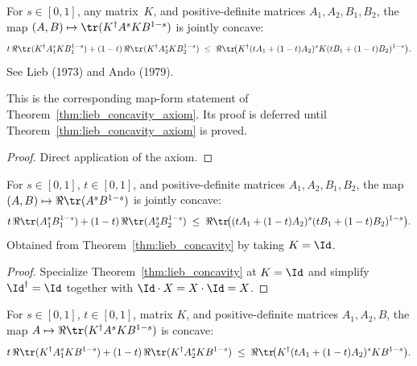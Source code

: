 \begin{theorem}\label{thm:lieb_concavity_axiom}
    \notready
    For $s\in[0,1]$, any matrix~$K$, and positive-definite matrices
    $A_1,A_2,B_1,B_2$, the map
    $(A,B)\mapsto\tr(K^\dagger A^s K B^{1-s})$
    is jointly concave:
    \[
        t\,\Re\tr(K^\dagger A_1^s K B_1^{1-s})
        +(1-t)\,\Re\tr(K^\dagger A_2^s K B_2^{1-s})
        \;\le\;
        \Re\tr\!\bigl(K^\dagger(tA_1+(1-t)A_2)^s K (tB_1+(1-t)B_2)^{1-s}\bigr).
    \]
    See Lieb (1973) and Ando (1979).
\end{theorem}

\begin{theorem}\label{thm:lieb_concavity}
    \notready
    This is the corresponding map-form statement of
    Theorem~\ref{thm:lieb_concavity_axiom}.
    Its proof is deferred until
    Theorem~\ref{thm:lieb_concavity_axiom} is proved.
\end{theorem}

\begin{proof}
    Direct application of the axiom.
\end{proof}

\begin{corollary}[Lieb concavity, $K=\Id$ case]\label{cor:lieb_concavity_id}
    \leanok
    For $s\in[0,1]$, $t\in[0,1]$, and positive-definite matrices $A_1,A_2,B_1,B_2$, the
    map $(A,B)\mapsto\Re\tr(A^s B^{1-s})$ is jointly concave:
    \[
        t\,\Re\tr(A_1^s B_1^{1-s})+(1-t)\,\Re\tr(A_2^s B_2^{1-s})
        \;\le\;
        \Re\tr\!\bigl((tA_1+(1-t)A_2)^s (tB_1+(1-t)B_2)^{1-s}\bigr).
    \]
    Obtained from Theorem~\ref{thm:lieb_concavity} by taking $K=\Id$.
\end{corollary}

\begin{proof}\leanok
    Specialize Theorem~\ref{thm:lieb_concavity} at $K=\Id$ and simplify
    $\Id^{\dagger}=\Id$ together with $\Id\cdot X=X\cdot\Id=X$.
\end{proof}

\begin{corollary}
    \label{cor:lieb_concavity_in_fst}
    \leanok
    For $s\in[0,1]$, $t\in[0,1]$, matrix $K$, and positive-definite matrices $A_1,A_2,B$,
    the map $A\mapsto\Re\tr(K^\dagger A^s K B^{1-s})$ is concave:
    \[
        t\,\Re\tr(K^\dagger A_1^s K B^{1-s})
        +(1-t)\,\Re\tr(K^\dagger A_2^s K B^{1-s})
        \;\le\;
        \Re\tr\!\bigl(K^\dagger(tA_1+(1-t)A_2)^s K B^{1-s}\bigr).
    \]
\end{corollary}

